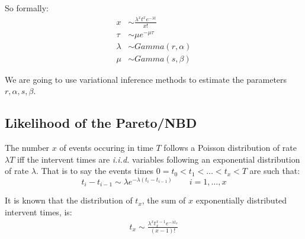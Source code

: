 \documentclass{tufte-book}
\begin{document}
So formally:
\begin{align*}
x & \sim \frac{\lambda^x t^x e^{-\lambda t}}{x !} \\
\tau & \sim \mu e^{-\mu \tau} \\
\lambda & \sim Gamma(r,\alpha) \\
\mu & \sim Gamma(s, \beta)
\end{align*}

We are going to use variational inference methods to estimate the
parameters $r,\alpha, s, \beta$.

\subsection{Likelihood of the Pareto/NBD}
\label{sub:likelihood_of_the_pareto_nbd}

The number $x$ of events occuring in time $T$ follows a Poisson
distribution of rate $\lambda T$ iff the intervent times are
\emph{i.i.d.}  variables following an exponential distribution of rate
$\lambda$. That is to say the events times $0=t_0 < t_1 < \ldots < t_x
<T$ are such that:
$$t_i - t_{i-1} \sim \lambda e^{-\lambda (t_i - t_{i-1})} \qquad
i=1,\ldots,x $$

It is known that the distribution of $t_x$, the sum of $x$
exponentially distributed intervent times, is:
\begin{align*}
  t_x \sim \frac{\lambda^x t_x^{x-1} e^{-\lambda t_x}}{(x-1)!}
\end{align*}
\end{document}
